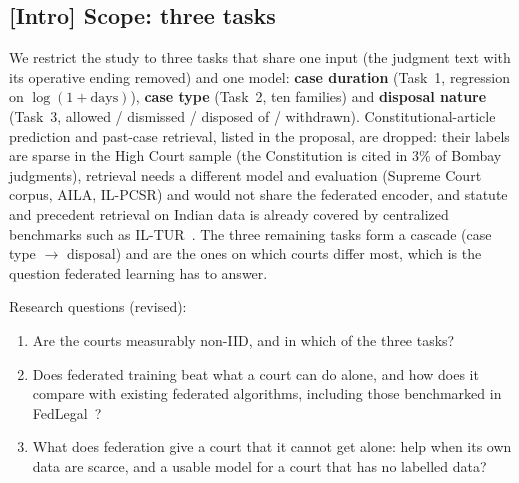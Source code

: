 \newcommand{\tbd}{\textcolor{gray}{--}}

\subsection*{[Intro] Scope: three tasks}
We restrict the study to three tasks that share one input (the judgment text with its operative
ending removed) and one model: \textbf{case duration} (Task~1, regression on $\log(1+\text{days})$),
\textbf{case type} (Task~2, ten families) and \textbf{disposal nature} (Task~3, allowed / dismissed /
disposed of / withdrawn). Constitutional-article prediction and past-case retrieval, listed in the
proposal, are dropped: their labels are sparse in the High Court sample (the Constitution is cited in
3\% of Bombay judgments), retrieval needs a different model and evaluation (Supreme Court corpus, AILA,
IL-PCSR) and would not share the federated encoder, and statute and precedent retrieval on Indian data
is already covered by centralized benchmarks such as IL-TUR~\cite{joshi2024iltur}. The three remaining
tasks form a cascade (case type $\rightarrow$ disposal) and are the ones on which courts differ most,
which is the question federated learning has to answer.

Research questions (revised):
\begin{enumerate}
  \item[RQ1] Are the courts measurably non-IID, and in which of the three tasks?
  \item[RQ2] Does federated training beat what a court can do alone, and how does it compare with
             existing federated algorithms, including those benchmarked in FedLegal~\cite{zhang2023fedlegal}?
  \item[RQ3] What does federation give a court that it cannot get alone: help when its own data are
             scarce, and a usable model for a court that has no labelled data?
\end{enumerate}

